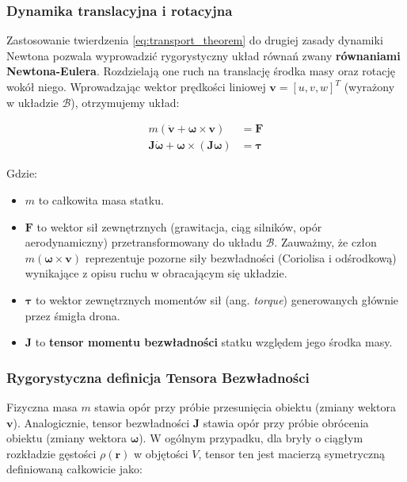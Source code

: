 \subsubsection{Dynamika translacyjna i rotacyjna}

Zastosowanie twierdzenia \eqref{eq:transport_theorem} do drugiej zasady dynamiki Newtona pozwala wyprowadzić rygorystyczny układ równań zwany \textbf{równaniami Newtona-Eulera}. Rozdzielają one ruch na translację środka masy oraz rotację wokół niego. Wprowadzając wektor prędkości liniowej $\mathbf{v} = [u, v, w]^T$ (wyrażony w układzie $\mathcal{B}$), otrzymujemy układ:

\begin{align}
    m (\mathbf{\dot{v}} + \boldsymbol{\omega} \times \mathbf{v}) &= \mathbf{F} \label{eq:newton_trans} \\
    \mathbf{J} \mathbf{\dot{\boldsymbol{\omega}}} + \boldsymbol{\omega} \times (\mathbf{J} \boldsymbol{\omega}) &= \boldsymbol{\tau} \label{eq:euler_rot}
\end{align}

Gdzie:
\begin{itemize}
    \item $m$ to całkowita masa statku.
    \item $\mathbf{F}$ to wektor sił zewnętrznych (grawitacja, ciąg silników, opór aerodynamiczny) przetransformowany do układu $\mathcal{B}$. Zauważmy, że człon $m(\boldsymbol{\omega} \times \mathbf{v})$ reprezentuje pozorne siły bezwładności (Coriolisa i odśrodkową) wynikające z opisu ruchu w obracającym się układzie.
    \item $\boldsymbol{\tau}$ to wektor zewnętrznych momentów sił (ang. \textit{torque}) generowanych głównie przez śmigła drona.
    \item $\mathbf{J}$ to \textbf{tensor momentu bezwładności} statku względem jego środka masy.
\end{itemize}

\subsubsection{Rygorystyczna definicja Tensora Bezwładności}

Fizyczna masa $m$ stawia opór przy próbie przesunięcia obiektu (zmiany wektora $\mathbf{v}$). Analogicznie, tensor bezwładności $\mathbf{J}$ stawia opór przy próbie obrócenia obiektu (zmiany wektora $\boldsymbol{\omega}$). W ogólnym przypadku, dla bryły o ciągłym rozkładzie gęstości $\rho(\mathbf{r})$ w objętości $V$, tensor ten jest macierzą symetryczną definiowaną całkowicie jako:

